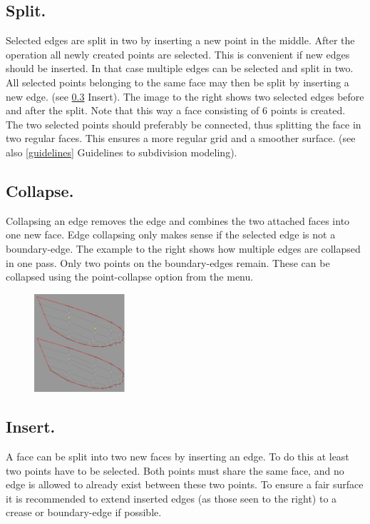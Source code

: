 \documentclass[12pt]{article}
\begin{document}
\subsection{Split.}
Selected edges are split in two by inserting a new
point in the middle. After the operation all newly
created points are selected. This is convenient if new
edges should be inserted. In that case multiple edges
can be selected and split in two. All selected points
belonging to the same face may then be split by
inserting a new edge. (see \ref{edge-insert} Insert). The image to
the right shows two selected edges before and after
the split. Note that this way a face consisting of 6
points is created. The two selected points should
preferably be connected, thus splitting the face in two
regular faces. This ensures a more regular grid and a
smoother surface. (see also \ref{guidelines} Guidelines to
subdivision modeling).

\subsection{Collapse.} \label{edge-collapse}
Collapsing an edge removes the edge and combines the two attached
faces into one new face.  Edge collapsing only makes sense if the
selected edge is not a boundary-edge. The example to the right shows
how multiple edges are collapsed in one pass. Only two points on the
boundary-edges remain. These can be collapsed using the point-collapse
option from the menu.

\begin{figure}
        \centering
        \includegraphics[width=0.3\textwidth,natwidth=560,natheight=605]{insertedge.png}
        \caption{}
        \label{fig:edgeinsert}
\end{figure}

\subsection{Insert.} \label{edge-insert}
A face can be split into two new faces by inserting an edge. To do
this at least two points have to be selected. Both points must share
the same face, and no edge is allowed to already exist between these
two points. To ensure a fair surface it is recommended to extend
inserted edges (as those seen to the right) to a crease or
boundary-edge if possible.
\end{document}
